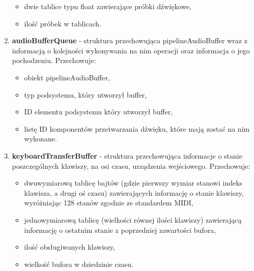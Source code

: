 \begin{enumerate}
\begin{itemize}
        \item dwie tablice typu float zawierające próbki dźwiękowe,
        \item ilość próbek w tablicach.
    \end{itemize}
    \item \textbf{audioBufferQueue} - struktura przechowująca pipelineAudioBuffer wraz z informacją o kolejności wykonywania na nim operacji oraz informacja o jego pochodzeniu. Przechowuje:
    \begin{itemize}
        \item obiekt pipelineAudioBuffer,
        \item typ podsystemu, który utworzył buffer,
        \item ID elementu podsystemu który utworzył buffer,
        \item listę ID komponentów przetwarzania dźwięku, które mają zostać na nim wykonane.
    \end{itemize}
    \item \textbf{keyboardTransferBuffer} - struktura przechowująca informacje o stanie poszczególnych klawiszy, na osi czasu, urządzenia wejściowego. Przechowuje:
    \begin{itemize}
        \item dwuwymiarową tablicę bajtów (gdzie pierwszy wymiar stanowi indeks klawisza, a drugi oś czasu) zawierających informację o stanie klawiszy, wyróżniając 128 stanów zgodnie ze standardem MIDI,
        \item jednowymiarową tablicę (wielkości równej ilości klawiszy) zawierającą informację o ostatnim stanie z poprzedniej zawartości bufora,
        \item ilość obsługiwanych klawiszy,
        \item wielkość bufora w dziedzinie czasu.
    \end{itemize}
\end{enumerate}


